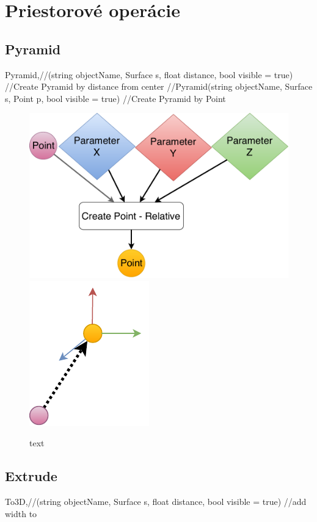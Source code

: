 \section{Priestorové operácie}


\subsection{Pyramid}
Pyramid,//(string objectName, Surface s, float distance, bool visible = true) //Create Pyramid by distance from center
//Pyramid(string objectName, Surface s, Point p, bool visible = true) //Create Pyramid by Point

\begin{figure}[H]
	\centering
	\includegraphics[height=0.3\textwidth]{obrazky-figures/Diagram/DP Navrh operacii-0D - Point2.pdf}
	\includegraphics[height=0.3\textwidth]{obrazky-figures/Diagram/Draw/1Points/DP Navrh operacii-0D - PointRelative.pdf}
	\caption{text}
	\label{fig:1}
\end{figure}


\subsection{Extrude} 
To3D,//(string objectName, Surface s, float distance, bool visible = true) //add width to 

